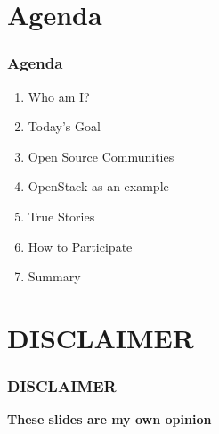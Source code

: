 \documentclass[aspectratio=169,11pt,hyperref={colorlinks=true}]{beamer}
\begin{document}
\section{Agenda}
\begin{frame}
  \frametitle{Agenda}
  \begin{enumerate}
    \item Who am I?
    \item Today's Goal
    \item Open Source Communities
    \item OpenStack as an example
    \item True Stories
    \item How to Participate
    \item Summary
  \end{enumerate}
\end{frame}

\section{DISCLAIMER}
\begin{frame}
  \frametitle{DISCLAIMER}
  \Huge{\bf{These slides are my own opinion}}
\end{frame}
\end{document}
